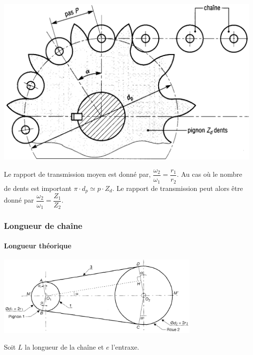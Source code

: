 \documentclass[11pt,oneside]{article}
\begin{document}
\begin{minipage}[c]{.45\linewidth}
\begin{center}
\includegraphics[width=.9\textwidth]{png/fig_50}
\end{center}
\end{minipage} \hfill
\begin{minipage}[c]{.5\linewidth}
Le rapport de transmission moyen est donné par,  $\dfrac{\omega_2}{\omega_1}=\dfrac{r_1}{r_2}$.
Au cas où le nombre de dents est important $\pi \cdot d_p \simeq p\cdot Z_d$.
Le rapport de transmission peut alors être donné par $\dfrac{\omega_2}{\omega_1}=\dfrac{Z_1}{Z_2}$.

\end{minipage} 

\subsubsection{Longueur de chaîne}
\paragraph{Longueur théorique}
\begin{center}
\includegraphics[height=4cm]{png/fig_51}
\end{center}

Soit $L$ la longueur de la chaîne et $e$ l'entraxe.
\end{document}
